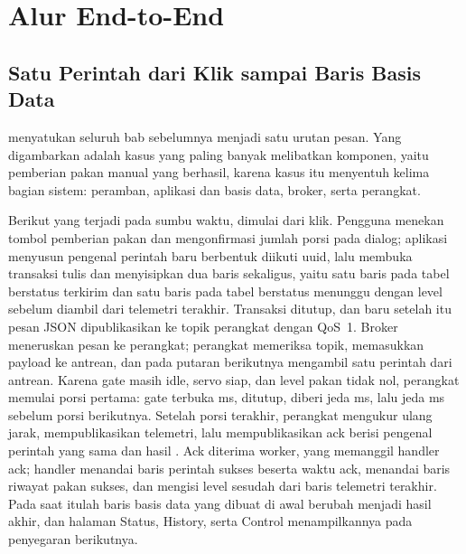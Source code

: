 \chapter{Alur End-to-End}
\label{ch:08-end-to-end}

\section{Satu Perintah dari Klik sampai Baris Basis Data}

 menyatukan seluruh bab sebelumnya menjadi satu urutan
pesan. Yang digambarkan adalah kasus yang paling banyak melibatkan komponen, yaitu
pemberian pakan manual yang berhasil, karena kasus itu menyentuh kelima bagian
sistem: peramban, aplikasi dan basis data, broker, serta perangkat.


Berikut yang terjadi pada sumbu waktu, dimulai dari klik. Pengguna menekan tombol
pemberian pakan dan mengonfirmasi jumlah porsi pada dialog; aplikasi menyusun
pengenal perintah baru berbentuk  diikuti uuid, lalu membuka transaksi
tulis dan menyisipkan dua baris sekaligus, yaitu satu baris pada tabel
 berstatus terkirim dan satu baris pada tabel 
berstatus menunggu dengan level sebelum diambil dari telemetri terakhir. Transaksi
ditutup, dan baru setelah itu pesan JSON dipublikasikan ke topik perangkat dengan
QoS~1. Broker meneruskan pesan ke perangkat; perangkat memeriksa topik, memasukkan
payload ke antrean, dan pada putaran  berikutnya mengambil satu
perintah dari antrean. Karena gate masih idle, servo siap, dan level pakan tidak
nol, perangkat memulai porsi pertama: gate terbuka \PortionOpenMs{} ms, ditutup,
diberi jeda \SettleMs{} ms, lalu jeda \GapMs{} ms sebelum porsi berikutnya.
Setelah porsi terakhir, perangkat mengukur ulang jarak, mempublikasikan telemetri,
lalu mempublikasikan ack berisi pengenal perintah yang sama dan hasil .
Ack diterima worker, yang memanggil handler ack; handler menandai baris perintah
sukses beserta waktu ack, menandai baris riwayat pakan sukses, dan mengisi level
sesudah dari baris telemetri terakhir. Pada saat itulah baris basis data yang
dibuat di awal berubah menjadi hasil akhir, dan halaman Status, History, serta
Control menampilkannya pada penyegaran berikutnya.

